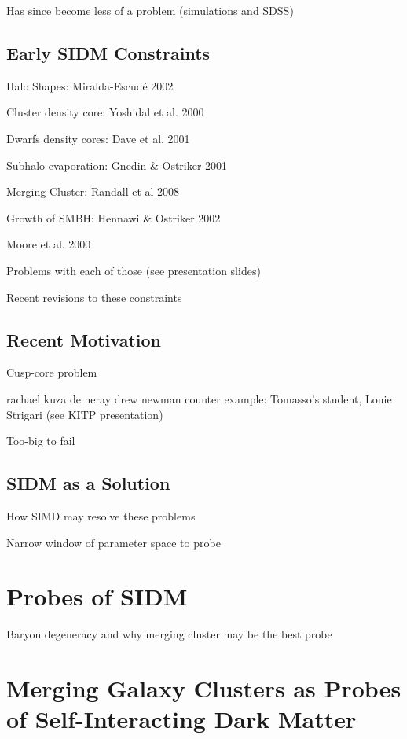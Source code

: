 Has since become less of a problem (simulations and SDSS)

\subsection{Early SIDM Constraints}

Halo Shapes: Miralda-Escudé 2002

Cluster density core: Yoshidal et al. 2000

Dwarfs density cores: Dave et al. 2001

Subhalo evaporation: Gnedin \& Ostriker 2001

Merging Cluster: Randall et al 2008

Growth of SMBH: Hennawi \& Ostriker 2002

Moore et al. 2000 \citep{Moore:2000ee}

Problems with each of those (see presentation slides)

Recent revisions to these constraints \citep{Peter:2012vi}

\subsection{Recent Motivation}

Cusp-core problem

	rachael kuza de neray
	drew newman
	counter example: Tomasso's student, Louie Strigari (see KITP presentation)

Too-big to fail

\subsection{SIDM as a Solution}

How SIMD may resolve these problems

Narrow window of parameter space to probe \citep{Rocha:2012tr}

\section{Probes of SIDM}



Baryon degeneracy and why merging cluster may be the best probe

\section{Merging Galaxy Clusters as Probes of Self-Interacting Dark Matter}

